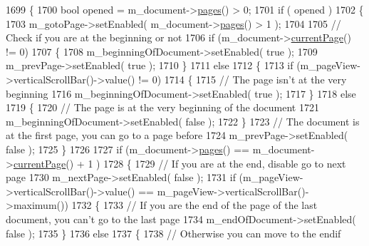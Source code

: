 \begin{DoxyCode}
1699 \{
1700     \textcolor{keywordtype}{bool} opened = m\_document->\hyperlink{classOkular_1_1Document_aaf5d986758e25127946986abaa401bcd}{pages}() > 0;
1701     \textcolor{keywordflow}{if} ( opened )
1702     \{
1703         m\_gotoPage->setEnabled( m\_document->\hyperlink{classOkular_1_1Document_aaf5d986758e25127946986abaa401bcd}{pages}() > 1 );
1704         
1705         \textcolor{comment}{// Check if you are at the beginning or not}
1706         \textcolor{keywordflow}{if} (m\_document->\hyperlink{classOkular_1_1Document_a42ec374d73794bf56d7e7b11f1f56319}{currentPage}() != 0)
1707         \{
1708             m\_beginningOfDocument->setEnabled( \textcolor{keyword}{true} );
1709             m\_prevPage->setEnabled( \textcolor{keyword}{true} );
1710         \}
1711         \textcolor{keywordflow}{else} 
1712         \{
1713             \textcolor{keywordflow}{if} (m\_pageView->verticalScrollBar()->value() != 0)
1714             \{
1715                 \textcolor{comment}{// The page isn't at the very beginning}
1716                 m\_beginningOfDocument->setEnabled( \textcolor{keyword}{true} );
1717             \}
1718             \textcolor{keywordflow}{else}
1719             \{
1720                 \textcolor{comment}{// The page is at the very beginning of the document}
1721                 m\_beginningOfDocument->setEnabled( \textcolor{keyword}{false} );
1722             \}
1723             \textcolor{comment}{// The document is at the first page, you can go to a page before}
1724             m\_prevPage->setEnabled( \textcolor{keyword}{false} );
1725         \}
1726         
1727         \textcolor{keywordflow}{if} (m\_document->\hyperlink{classOkular_1_1Document_aaf5d986758e25127946986abaa401bcd}{pages}() == m\_document->\hyperlink{classOkular_1_1Document_a42ec374d73794bf56d7e7b11f1f56319}{currentPage}() + 1 )
1728         \{
1729             \textcolor{comment}{// If you are at the end, disable go to next page}
1730             m\_nextPage->setEnabled( \textcolor{keyword}{false} );
1731             \textcolor{keywordflow}{if} (m\_pageView->verticalScrollBar()->value() == m\_pageView->verticalScrollBar()->maximum())
1732             \{
1733                 \textcolor{comment}{// If you are the end of the page of the last document, you can't go to the last page}
1734                 m\_endOfDocument->setEnabled( \textcolor{keyword}{false} );
1735             \}
1736             \textcolor{keywordflow}{else} 
1737             \{
1738                 \textcolor{comment}{// Otherwise you can move to the endif}

\end{DoxyCode}
